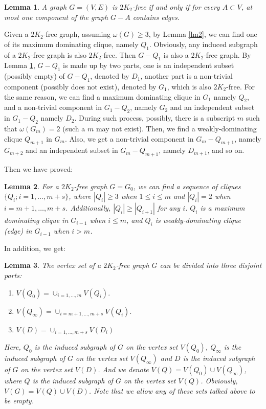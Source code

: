 \documentclass{amsart}
\newtheorem{lemma}{Lemma}
\begin{document}
\begin{lemma}\label{lm3}{\cite[Observation 1.]{broersma2014toughness}}
A graph $G=(V,E)$ is $2K_2$-free if and only if for every $A\subset V$, at most one component of the graph $G-A$ contains edges.
\end{lemma}






Given a $2K_2$-free graph, assuming $\omega(G)\ge3$, by Lemma \ref{lm2}, we can find one of its maximum dominating clique, namely $Q_1$. Obviously, any induced subgraph of a $2K_2$-free graph is also $2K_2$-free. Then $G-Q_1$ is also a $2K_2$-free graph. By Lemma \ref{lm3}, $G-Q_1$ is made up by two parts, one is an independent subset (possibly empty) of $G-Q_1$, denoted by $D_1$, another part is a non-trivial component (possibly does not exist), denoted by $G_1$, which is also $2K_2$-free. For the same reason, we can find a maximum dominating clique in $G_1$ namely $Q_2$, and a non-trivial component in $G_1-Q_2$, namely $G_2$ and an independent subset in $G_1-Q_2$ namely $D_2$. During such process, possibly, there is a subscript $m$ such that $\omega(G_m)=2$ (such a $m$ may not exist). Then, we find a weakly-dominating clique $Q_{m+1}$ in $G_m$. Also, we get a non-trivial component in $G_m-Q_{m+1}$, namely $G_{m+2}$ and an independent subset in $G_m-Q_{m+1}$, namely $D_{m+1}$, and so on.

Then we have proved:
\begin{lemma}\label{lm5}
For a $2K_2$-free graph $G=G_0$, we can find a sequence of cliques $\{Q_i;i=1,\ldots,m+s\}$, where $|Q_i|\ge3$ when $1\le i\le m$ and $|Q_i|=2$ when $i=m+1,\ldots,m+s$. Additionally, $|Q_i|\ge|Q_{i+1}|$ for any $i$. $Q_i$ is a maximum dominating clique in $G_{i-1}$ when $i\le m$, and $Q_i$ is weakly-dominating clique (edge) in $G_{i-1}$ when $i>m$.
\end{lemma}


In addition, we get:

\begin{lemma}\label{lm6}
The vertex set of a $2K_2$-free graph $G$ can be divided into three disjoint parts:
\begin{enumerate}
\item $V(Q_0)=\cup_{i=1,\ldots,m}V(Q_i).$
\item $V(Q_{\infty})=\cup_{i=m+1,\ldots,m+s}V(Q_i).$
\item $V(D)=\cup_{i=1,\ldots,m+s}V(D_i)$
\end{enumerate}
Here, $Q_0$ is the induced subgraph of $G$ on the vertex set $V(Q_0)$, $Q_{\infty}$ is the induced subgraph of $G$ on the vertex set $V(Q_{\infty})$ and $D$ is the induced subgraph of $G$ on the vertex set $V(D)$. And we denote $V(Q)=V(Q_0)\cup V(Q_{\infty})$, where $Q$ is the induced subgraph of $G$ on the vertex set $V(Q)$. Obviously, $V(G)=V(Q)\cup V(D)$. Note that we allow any of these sets talked above to be empty.
\end{lemma}
\end{document}
